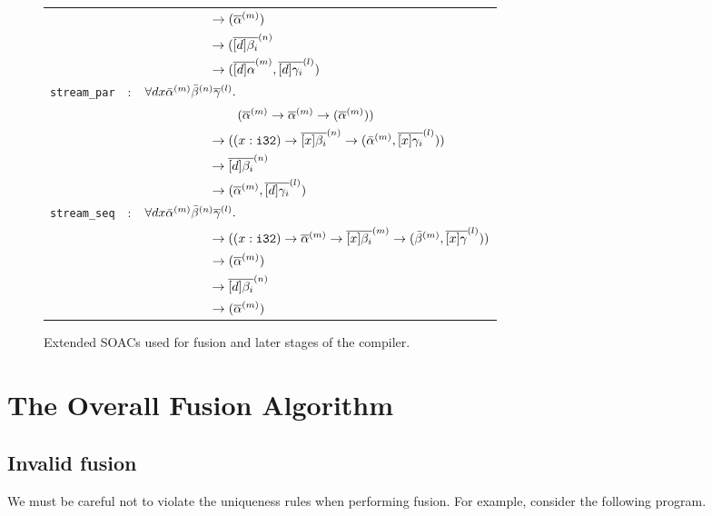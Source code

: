 \begin{figure}[hbt]
\begin{tabular}{lcl}
          & & ~~~~~~~~~~ $\rightarrow (\overline{\alpha}^{(m)})$\\
          & & ~~~~~~~~~~ $\rightarrow (\overline{[d]\beta_i}^{(n)}$\\
          & & ~~~~~~~~~~ $\rightarrow (\overline{[d]\alpha}^{(m)},\overline{[d]\gamma_{i}}^{(l)})$ \\
  {\lstinline!stream_par!} & : & $\forall d x \bar{\alpha}^{(m)}\bar{\beta}^{(n)}\overline{\gamma}^{(l)}.$\\
          & & ~~~~~~~~~~~~~~ $(\overline{\alpha}^{(m)} \rightarrow \overline{\alpha}^{(m)} \rightarrow (\overline{\alpha}^{(m)}))$\\
          & & ~~~~~~~~~~ $\rightarrow ((x: \texttt{i32}) \rightarrow \overline{[x]\beta_i}^{(n)} \rightarrow (\bar{\alpha}^{(m)}, \overline{[x]\gamma_{i}}^{(l)}))$ \\
          & & ~~~~~~~~~~ $\rightarrow \overline{[d]\beta_i}^{(n)}$\\
          & & ~~~~~~~~~~ $\rightarrow (\overline{\alpha}^{(m)},\overline{[d]\gamma_{i}}^{(l)})$ \\
  {\lstinline!stream_seq!} & : & $\forall d x \bar{\alpha}^{(m)}\bar{\beta}^{(n)}\overline{\gamma}^{(l)}.$\\
          & & ~~~~~~~~~~ $\rightarrow ((x: \texttt{i32}) \rightarrow \overline{\alpha}^{(m)} \rightarrow \overline{[x]\beta_i}^{(m)} \rightarrow (\bar{\beta}^{(m)}, \overline{[x]\gamma}^{(l)}))$ \\
          & & ~~~~~~~~~~ $\rightarrow (\overline{\alpha}^{(m)})$\\
          & & ~~~~~~~~~~ $\rightarrow \overline{[d]\beta_i}^{(n)}$\\
          & & ~~~~~~~~~~ $\rightarrow (\overline{\alpha}^{(m)})$ \\

\end{tabular}
\caption{Extended SOACs used for fusion and later stages of the compiler.}
\label{fig:newSoacType}
\end{figure}

\section{The Overall Fusion Algorithm}
\label{sec:fusion-algorithm}

\subsection{Invalid fusion}
\label{sec:invalidfusion}

We must be careful not to violate the uniqueness rules when performing
fusion.  For example, consider the following program.

